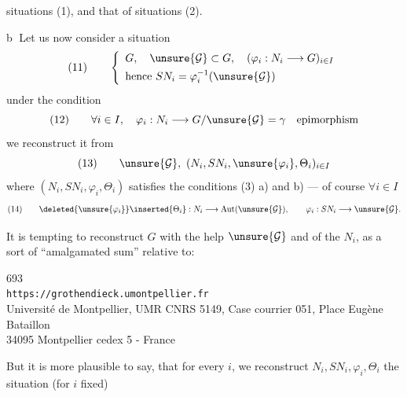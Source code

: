 
situations (1), and that of situations (2).

\textcircled{b}
Let us now consider a situation
\[
(11)\qquad 
\left\{\begin{array}{l}
G,\quad \unsure{\mathcal G}\subset G,\quad (\varphi_i:N_i\longrightarrow G)_{i\in I}\\[4pt]
\text{hence }SN_i=\varphi_i^{-1}(\unsure{\mathcal G})
\end{array}\right.
\]
under the condition
\[
(12)\qquad 
\forall i\in I,\quad \varphi_i:N_i\longrightarrow G/\unsure{\mathcal G}=\gamma\quad\text{epimorphism}
\]
 we reconstruct it from
\[
(13)\qquad 
\unsure{\mathcal G},\ (N_i,SN_i,\unsure{\varphi_i},\Theta_i)_{i\in I}
\]
where  $(N_i,SN_i,\varphi_i,\Theta_i)$ satisfies the conditions (3) a) and b) ---  of course $\forall i\in I$
\[
(14)\qquad 
\deleted{\unsure{\varphi_i}}\inserted{\Theta_i}:N_i\longrightarrow\operatorname{Aut}(\unsure{\mathcal G}),\qquad
\varphi_i:SN_i\longrightarrow\unsure{\mathcal G}.
\]

It is tempting to reconstruct $G$ with the help  $\unsure{\mathcal G}$ and of the $N_i$, as a sort of ``amalgamated sum'' relative to:

\noindent {}\quad
{}


\begin{center}
693\\
\texttt{https://grothendieck.umontpellier.fr}\\
Université de Montpellier, UMR CNRS 5149, Case courrier 051, Place Eugène Bataillon\\
34095 Montpellier cedex 5 - France
\end{center}




But it is more plausible to say, that for every $i$, we reconstruct  $N_i,SN_i,\varphi_i,\Theta_i$ the situation (for $i$ fixed)

